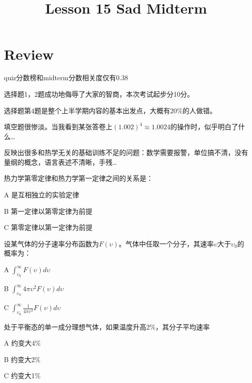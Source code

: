 \documentclass[CJK]{beamer}
\title{Lesson 15 Sad Midterm}
\author{}
\date{}
\begin{document}

\section{Review}

\begin{frame}
\bch
\bitem
\item{quiz分数榜和midterm分数相关度仅有0.38}
\item{选择题1，2题成功地侮辱了大家的智商，本次考试起步分10分。}
\item{选择题第4题是整个上半学期内容的基本出发点，大概有20\%的人做错。}
\item{填空题很惨淡。当我看到某张答卷上$(1.002)^4\approx 1.0024$的操作时，似乎明白了什么…}
\item{反映出很多和热学无关的基础训练不足的问题：数学需要报警，单位搞不清，没有量纲的概念，语言表述不清晰，手残…}
  
\eitem
\ech
\end{frame}


\begin{frame}
\bchL
热力学第零定律和热力学第一定律之间的关系是：
\bitem
\item[A]{是互相独立的实验定律}
\item[B]{第一定律以第零定律为前提}
\item[C]{第零定律以第一定律为前提}    
\eitem
\echL
\end{frame}


\begin{frame}
\bchL
设某气体的分子速率分布函数为$F(\upsilon)$。气体中任取一个分子，其速率$\upsilon$大于$\upsilon_0$的概率为：
\bitem
\item[A]{$\int_{\upsilon_0}^\infty F(\upsilon)d\upsilon$}
\item[B]{$\int_{\upsilon_0}^\infty 4\pi\upsilon^2 F(\upsilon)d\upsilon$}
\item[C]{$\int_{\upsilon_0}^\infty \frac{1}{4\pi\upsilon^2} F(\upsilon)d\upsilon$}    
\eitem
\echL
\end{frame}





\begin{frame}
\bchL
处于平衡态的单一成分理想气体，如果温度升高2\%，其分子平均速率
\bitem
\item[A]{约变大4\%}
\item[B]{约变大2\%}
\item[C]{约变大1\%}
  \eitem
\echL
\end{frame}
\end{document}
